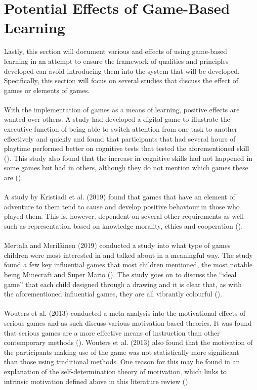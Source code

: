 \section{Potential Effects of Game-Based Learning}
Lastly, this section will document various and effects of using game-based learning in an attempt to ensure the framework of qualities and principles developed can avoid introducing them into the system that will be developed. Specifically, this section will focus on several studies that discuss the effect of games or elements of games. 
\\\\
With the implementation of games as a means of learning, positive effects are wanted over others. A study had developed a digital game to illustrate the executive function of being able to switch attention from one task to another effectively and quickly and found that participants that had several hours of playtime performed better on cognitive tests that tested the aforementioned skill (\cite{Mayer2019}). This study also found that the increase in cognitive skills had not happened in some games but had in others, although they do not mention which games these are (\cite{Mayer2019}). 
\\\\
A study by Kristiadi et al. (2019) found that games that have an element of adventure to them tend to cause and develop positive behaviour in those who played them. This is, however, dependent on several other requirements as well such as representation based on knowledge morality, ethics and cooperation (\cite{Kristiadi2019}). 
\\\\
Mertala and Meriläinen (2019) conducted a study into what type of games children were most interested in and talked about in a meaningful way. The study found a few key influential games that most children mentioned, the most notable being Minecraft and Super Mario (\cite{Mertala2019}). The study goes on to discuss the “ideal game” that each child designed through a drawing and it is clear that, as with the aforementioned influential games, they are all vibrantly colourful (\cite{Mertala2019}).
\\\\
Wouters et al. (2013) conducted a meta-analysis into the motivational effects of serious games and as such discuss various motivation based theories. It was found that serious games are a more effective means of instruction than other contemporary methods (\cite{Wouters2013}). Wouters et al. (2013) also found that the motivation of the participants making use of the game was not statistically more significant than those using traditional methods. One reason for this may be found in an explanation of the self-determination theory of motivation, which links to intrinsic motivation defined above in this literature review (\cite{Wouters2013}).
